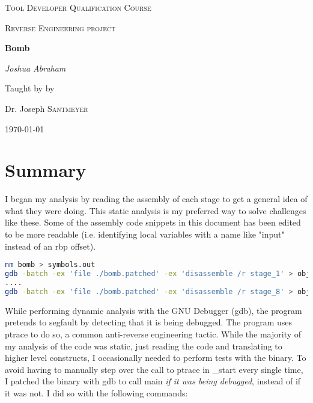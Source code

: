 \documentclass{article}
\begin{document}
\begin{titlepage}
	\centering
	{\scshape\LARGE Tool Developer Qualification Course\par}
	\vspace{1cm}
	{\scshape\Large Reverse Engineering project\par}
	\vspace{1.5cm}
	{\huge\bfseries Bomb\par}
	\vspace{2cm}
	{\Large\itshape Joshua Abraham\par}
	\vfill
	Taught by by\par
	Dr. Joseph \textsc{Santmeyer}
	\vfill
	{\large \today\par}
\end{titlepage}


\newpage
\tableofcontents
\newpage


\section{Summary}
\begin{flushleft}
\vspace{.5pc}
\end{flushleft}
\par
I began my analysis by reading the assembly of each stage to get a general
idea of what they were doing.  This static analysis is my preferred way to
solve challenges like these.  Some of the assembly code snippets in this
document has been edited to be more readable (i.e. identifying local 
variables with a name like "input" instead of an rbp offset).
\begin{lstlisting}[language=bash]
nm bomb > symbols.out
gdb -batch -ex 'file ./bomb.patched' -ex 'disassemble /r stage_1' > objectdumps/stage_1.out
....
gdb -batch -ex 'file ./bomb.patched' -ex 'disassemble /r stage_8' > objectdumps/stage_8.out
\end{lstlisting}

\par
While performing dynamic analysis with the GNU Debugger (gdb), the program 
pretends to segfault by detecting that it is being debugged.  The program 
uses ptrace to do so, a common anti-reverse engineering tactic.  While the
majority of my analysis of the code was static, just reading the code and
translating to higher level constructs, I occasionally needed to perform 
tests with the binary.  To avoid having to manually step over the call to 
ptrace in \_start every single time, I patched the binary with gdb to call
main \textit{if it was being debugged}, instead of if it was not.  I did so
with the following commands:
\end{document}
